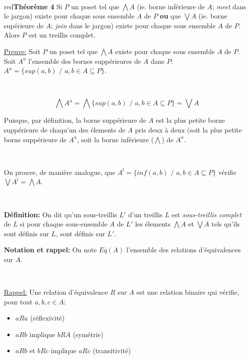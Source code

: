 \documentclass[a4paper, 11pt]{article}
\begin{document}
\

\begin{mybox}{red}{\textbf{Théorème 4}}
	Si $P$ un poset tel que $\bigwedge A$ (ie. borne inférieure de $A$; \textit{meet} dans le jargon) existe pour chaque sous ensemble $A$ de $P$ \textbf{ou} que $\bigvee A$ (ie. borne supérieure de $A$; \textit{join} dans le jargon) existe pour chaque sous ensemble $A$ de $P$. Alors $P$ est un treillis complet.
\end{mybox}

\noindent
\underline{Preuve:} Soit $P$ un poset tel que $\bigwedge A$ existe pour chaque sous ensemble $A$ de $P$. Soit $A^u$ l'ensemble des bornes suppérieures de $A$ dans $P$: $A^u =\{sup(a,b) \text{ / } a,b \in A \subseteq P\}$.

\

$$\bigwedge A^u = \bigwedge \{sup(a,b) \text{ / } a,b \in A \subseteq P\} = \bigvee A$$

Puisque, par définition, la borne suppérieure de $A$ est la plus petite borne suppérieure de chaqu'un des élements de $A$ pris deux à deux (soit la plus petite borne suppérieure de $A^u$, soit la borne inférieure ($\bigwedge$) de $A^u$. 

\

On prouve, de manière analogue, que $A^l =\{inf(a,b) \text{ / } a,b \in A \subseteq P\}$ vérifie $\bigvee A^l = \bigwedge A$.

\

\begin{tcolorbox} 
	\textbf{Définition:} On dit qu'un sous-treillis $L'$ d'un treillis $L$ est \textit{sous-treillis complet} de $L$ si pour chaque sous-ensemble $A$ de $L'$ les élements $\bigwedge A$ et $\bigvee A$ tels qu'ils sont définis sur $L$, sont définis sur $L'$. 
\end{tcolorbox}

\begin{tcolorbox} 
	\textbf{Notation et rappel:} On note $Eq(A)$ l'ensemble des relations d'équivalences sur $A$.

	\

	\underline{Rappel:} Une relation d'équivalence $R$ sur $A$ est une relation binaire qui vérifie, pour tout $a,b,c \in A:$
	\begin{itemize} 
		\item $aRa$ (réflexivité)
		\item $aRb$ implique $bRA$ (symétrie)
		\item $aRb$ et $bRc$ implique $aRc$ (transitivité)
	\end{itemize}
\end{tcolorbox}
\end{document}
